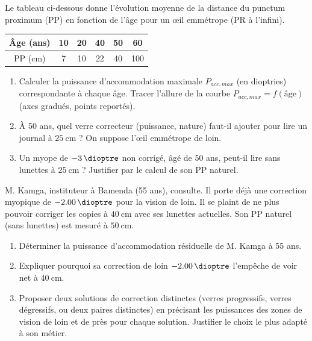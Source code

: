 \documentclass[11pt]{article}
\begin{document}
\begin{exercice}
Le tableau ci-dessous donne l'évolution moyenne de la distance du punctum proximum (PP) en fonction de l'âge pour un œil emmétrope (PR à l'infini).

\begin{center}
\begin{tabular}{|c|c|c|c|c|c|}
\hline
Âge (ans) & 10 & 20 & 40 & 50 & 60 \\
\hline
PP (cm) & 7  & 10 & 22 & 40 & 100 \\
\hline
\end{tabular}
\end{center}

\begin{enumerate}
    \item Calculer la puissance d'accommodation maximale $P_{acc,max}$ (en dioptries) correspondante à chaque âge. Tracer l'allure de la courbe $P_{acc,max} = f(\text{âge})$ (axes gradués, points reportés).
    \item À 50 ans, quel verre correcteur (puissance, nature) faut-il ajouter pour lire un journal à $\SI{25}{\centi\metre}$ ? On suppose l'œil emmétrope de loin.
    \item Un myope de $\SI{-3}{\dioptre}$ non corrigé, âgé de 50 ans, peut-il lire sans lunettes à $\SI{25}{\centi\metre}$ ? Justifier par le calcul de son PP naturel.
\end{enumerate}
\end{exercice}

\begin{exercice}
M. Kamga, instituteur à Bamenda (55 ans), consulte. Il porte déjà une correction myopique de $\SI{-2,00}{\dioptre}$ pour la vision de loin. Il se plaint de ne plus pouvoir corriger les copies à $\SI{40}{\centi\metre}$ avec ses lunettes actuelles. Son PP naturel (sans lunettes) est mesuré à $\SI{50}{\centi\metre}$.
\begin{enumerate}
    \item Déterminer la puissance d'accommodation résiduelle de M. Kamga à 55 ans.
    \item Expliquer pourquoi sa correction de loin $\SI{-2,00}{\dioptre}$ l'empêche de voir net à $\SI{40}{\centi\metre}$.
    \item Proposer deux solutions de correction distinctes (verres progressifs, verres dégressifs, ou deux paires distinctes) en précisant les puissances des zones de vision de loin et de près pour chaque solution. Justifier le choix le plus adapté à son métier.
\end{enumerate}
\end{exercice}
\end{document}
